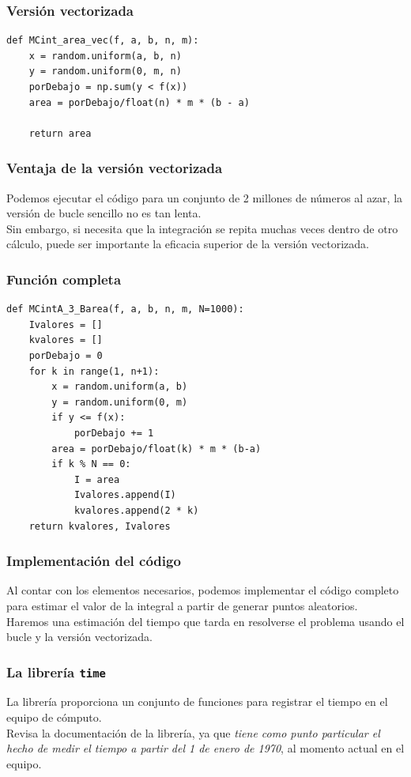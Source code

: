 \begin{frame}[fragile]
\frametitle{Versión vectorizada}
\begin{lstlisting}[caption=Método del dardo en modo vectorizado, style=codigopython]
def MCint_area_vec(f, a, b, n, m):
    x = random.uniform(a, b, n)
    y = random.uniform(0, m, n)
    porDebajo = np.sum(y < f(x))
    area = porDebajo/float(n) * m * (b - a)
    
    return area
\end{lstlisting}
\end{frame}
\begin{frame}
\frametitle{Ventaja de la versión vectorizada}
Podemos ejecutar el código para un conjunto de 2 millones de números al azar, la versión de bucle sencillo no es tan lenta.
\\
\bigskip
\pause
Sin embargo, si necesita que la integración se repita muchas veces dentro de otro cálculo, puede ser importante la eficacia superior de la versión vectorizada.
\end{frame}
\begin{frame}
\frametitle{Función completa}
\begin{lstlisting}[caption=Función para el método del dardo, style=codigopython]
def MCintA_3_Barea(f, a, b, n, m, N=1000):
    Ivalores = []
    kvalores = []
    porDebajo = 0
    for k in range(1, n+1):
        x = random.uniform(a, b)
        y = random.uniform(0, m)
        if y <= f(x):
            porDebajo += 1
        area = porDebajo/float(k) * m * (b-a)
        if k % N == 0:
            I = area
            Ivalores.append(I)
            kvalores.append(2 * k)
    return kvalores, Ivalores
\end{lstlisting}
\end{frame}
\begin{frame}
\frametitle{Implementación del código}
Al contar con los elementos necesarios, podemos implementar el código completo para estimar el valor de la integral a partir de generar puntos aleatorios.
\\
\bigskip
Haremos una estimación del tiempo que tarda en resolverse el problema usando el bucle y la versión vectorizada.
\end{frame}
\begin{frame}
\frametitle{La librería \texttt{time}}
La librería  proporciona un conjunto de funciones para registrar el tiempo en el equipo de cómputo.
\\
\bigskip
Revisa la documentación de la librería, ya que \emph{tiene como punto particular el hecho de medir el tiempo a partir del 1 de enero de 1970}, al momento actual en el equipo.
\end{frame}
